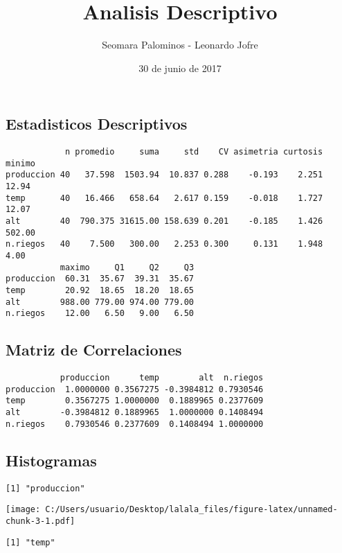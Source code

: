 \documentclass[]{article}
\title{Analisis Descriptivo}
\author{Seomara Palominos - Leonardo Jofre}
\date{30 de junio de 2017}
\begin{document}
\maketitle

\subsection{Estadisticos Descriptivos}\label{estadisticos-descriptivos}

\begin{verbatim}
            n promedio     suma     std    CV asimetria curtosis minimo
produccion 40   37.598  1503.94  10.837 0.288    -0.193    2.251  12.94
temp       40   16.466   658.64   2.617 0.159    -0.018    1.727  12.07
alt        40  790.375 31615.00 158.639 0.201    -0.185    1.426 502.00
n.riegos   40    7.500   300.00   2.253 0.300     0.131    1.948   4.00
           maximo     Q1     Q2     Q3
produccion  60.31  35.67  39.31  35.67
temp        20.92  18.65  18.20  18.65
alt        988.00 779.00 974.00 779.00
n.riegos    12.00   6.50   9.00   6.50
\end{verbatim}

\subsection{Matriz de Correlaciones}\label{matriz-de-correlaciones}

\begin{verbatim}
           produccion      temp        alt  n.riegos
produccion  1.0000000 0.3567275 -0.3984812 0.7930546
temp        0.3567275 1.0000000  0.1889965 0.2377609
alt        -0.3984812 0.1889965  1.0000000 0.1408494
n.riegos    0.7930546 0.2377609  0.1408494 1.0000000
\end{verbatim}

\pagebreak

\subsection{Histogramas}\label{histogramas}

\begin{verbatim}
[1] "produccion"
\end{verbatim}

\texttt{[image: C:/Users/usuario/Desktop/lalala\_files/figure-latex/unnamed-chunk-3-1.pdf]}

\begin{verbatim}
[1] "temp"
\end{verbatim}
\end{document}
